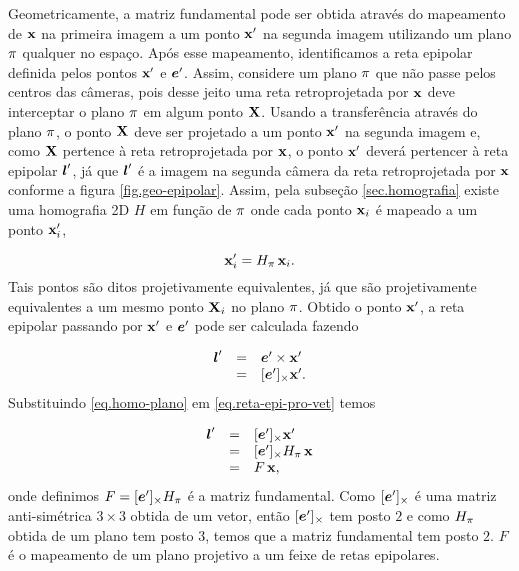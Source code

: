 Geometricamente, a matriz fundamental pode ser obtida através do mapeamento de $\mathbf{x}$ na primeira imagem a um ponto $\mathbf{x}'$ na segunda imagem utilizando um plano $\pi$ qualquer no espaço. Após esse mapeamento, identificamos a reta epipolar definida pelos pontos $\mathbf{x}'$ e $\boldsymbol{e}'$. Assim, considere um plano $\pi$ que não passe pelos centros das câmeras, pois desse jeito uma reta retroprojetada por $\mathbf{x}$ deve interceptar o plano $\pi$ em algum ponto $\mathbf{X}$. Usando a transferência através do plano $\pi$, o ponto $\mathbf{X}$ deve ser projetado a um ponto $\mathbf{x}'$ na segunda imagem e, como $\mathbf{X}$ pertence à reta retroprojetada por $\mathbf{x}$, o ponto $\mathbf{x}'$ deverá pertencer à reta epipolar $\boldsymbol{l}'$, já que $\boldsymbol{l}'$ é a imagem na segunda câmera da reta retroprojetada por $\mathbf{x}$ conforme a figura \ref{fig.geo-epipolar}. Assim, pela subseção \ref{sec.homografia} existe uma homografia 2D $H$ em função de $\pi$ onde cada ponto $\mathbf{x}_i$ é mapeado a um ponto $\mathbf{x}_i'$, 

\begin{equation}\label{eq.homo-plano}
\mathbf{x}'_i= H_{\pi} \,\mathbf{x}_i.
\end{equation}
Tais pontos são ditos projetivamente equivalentes, já que são projetivamente equivalentes a um mesmo ponto $\mathbf{X}_i$ no plano $\pi$. Obtido o ponto $\mathbf{x}'$, a reta epipolar passando por $\mathbf{x}'$ e $\boldsymbol{e}'$ pode ser calculada fazendo 

\begin{equation}\label{eq.reta-epi-pro-vet}
\begin{array}{rcl}
\boldsymbol{l}'&=&\boldsymbol{e}'\times\mathbf{x}'\\
&=&[\boldsymbol{e}']_\times\mathbf{x}'.
\end{array}
\end{equation}
Substituindo \ref{eq.homo-plano} em \ref{eq.reta-epi-pro-vet} temos

\begin{equation*}
\begin{array}{rcl}
\boldsymbol{l}'&=&[\boldsymbol{e}']_\times\mathbf{x}'\\
&=&[\boldsymbol{e}']_\times H_{\pi} \,\mathbf{x}\\
&=&F\,\mathbf{x},
\end{array}
\end{equation*} 
onde definimos $F=[\boldsymbol{e}']_\times H_{\pi}$ é a matriz fundamental. Como $[\boldsymbol{e}']_\times$ é uma matriz anti-simétrica $3\times3$ obtida de um vetor, então  $[\boldsymbol{e}']_\times$ tem posto $2$ e como $H_{\pi}$ obtida de um plano tem posto $3$, temos que a matriz fundamental tem posto $2$. $F$ é o mapeamento de um plano projetivo a um feixe de retas epipolares.


